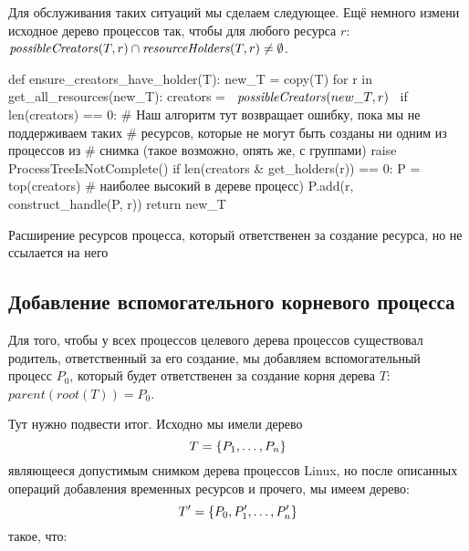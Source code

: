 Для обслуживания таких ситуаций мы сделаем следующее. Ещё немного измени исходное дерево процессов так, чтобы для любого ресурса $r$: $\text{\textit{possibleCreators}}(T, r) \cap \text{\textit{resourceHolders}}(T, r) \neq \emptyset$.

\begin{listing}
\begin{pythoncode}
def ensure_creators_have_holder(T):
    new_T = copy(T)
    for r in get_all_resources(new_T):
        creators = ~$\possibleCreators{new\_T}{r}$~
        if len(creators) == 0:
           # Наш алгоритм тут возвращает ошибку, пока мы не поддерживаем таких
           # ресурсов, которые не могут быть созданы ни одним из процессов из
           # снимка (такое возможно, опять же, с группами)
           raise ProcessTreeIsNotComplete()
        if len(creators & get_holders(r)) == 0:
            P = top(creators)  # наиболее высокий в дереве процесс)
            P.add(r, construct_handle(P, r))
    return new_T
\end{pythoncode}
\caption{Расширение ресурсов процесса, который ответственен за создание ресурса, но не ссылается на него}
\end{listing}

\subsection{Добавление вспомогательного корневого процесса}

Для того, чтобы у всех процессов целевого дерева процессов существовал родитель, ответственный за его создание, мы добавляем вспомогательный процесс $P_0$, который будет ответственен за создание корня дерева $T$: $parent(root(T)) = P_0$.

Тут нужно подвести итог. Исходно мы имели дерево 
\begin{equation*}
T = \left\lbrace P_1, \ldots, P_n \right\rbrace
\end{equation*} 
являющееся допустимым снимком дерева процессов Linux, но после описанных операций добавления временных ресурсов и прочего, мы имеем дерево:
\begin{equation*}
T' = \left\lbrace P_0, P_1', \ldots, P_n' \right\rbrace
\end{equation*}
такое, что:

